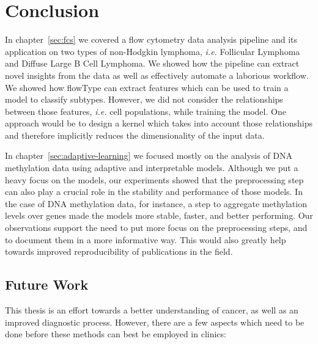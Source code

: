 \chapter{Conclusion}
In chapter~\ref{sec:fcs} we covered a flow cytometry data analysis pipeline
and its application on two types of non-Hodgkin lymphoma, \emph{i.e.}
Follicular Lymphoma and Diffuse Large B Cell Lymphoma. We showed how the
pipeline can extract novel insights from the data as well as effectively
automate a laborious workflow. We showed how flowType can extract features
which can be used to train a model to classify subtypes. However, we did not
consider the relationships between those features, \emph{i.e.} cell
populations, while training the model. One approach would be to design a kernel
which takes into account those relationships and therefore implicitly reduces
the dimensionality of the input data.

In chapter~\ref{sec:adaptive-learning} we focused mostly on the analysis of DNA
methylation data using adaptive and interpretable models. Although we put a
heavy focus on the models, our experiments showed that the preprocessing step
can also play a crucial role in the stability and performance of those models.
In the case of DNA methylation data, for instance, a step to aggregate
methylation levels over genes made the models more stable, faster, and better
performing. Our observations support the need to put more focus on the
preprocessing steps, and to document them in a more informative way. This would
also greatly help towards improved reproducibility of publications in the
field.

\section{Future Work}
This thesis is an effort towards a better understanding of cancer, as well as
an improved diagnostic process. However, there are a few aspects which need to
be done before these methods can best be employed in clinics:

